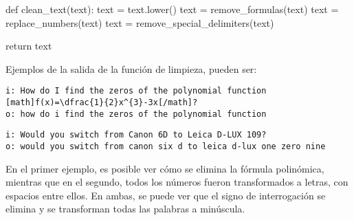 \bigskip

\begin{python}[caption={Ejemplo de función de limpieza.}, captionpos=b,label={lst:funcion-limpieza}]
def clean_text(text):
	text = text.lower()
	text = remove_formulas(text)
	text = replace_numbers(text)
	text = remove_special_delimiters(text)

	return text
\end{python}

\bigskip Ejemplos de la salida de la función de limpieza, pueden ser:

\begin{verbatim}
i: How do I find the zeros of the polynomial function
[math]f(x)=\dfrac{1}{2}x^{3}-3x[/math]?
o: how do i find the zeros of the polynomial function
\end{verbatim}

\begin{verbatim}
i: Would you switch from Canon 6D to Leica D-LUX 109?
o: would you switch from canon six d to leica d-lux one zero nine
\end{verbatim}

En el primer ejemplo, es posible ver cómo se elimina la fórmula polinómica, mientras que en el segundo, todos los números fueron transformados a letras, con espacios entre ellos. En ambas, se puede ver que el signo de interrogación se elimina y se transforman todas las palabras a minúscula.
